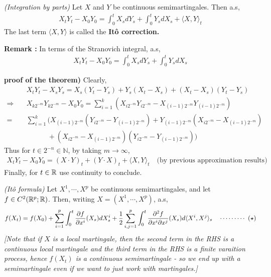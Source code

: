 \documentclass[12pt,a4paper]{article}
\newenvironment{proof}
{\begin{changemargin}{0.5cm}{0.5cm} 
	}%
	{\end{changemargin}
}
\newenvironment{p}
{\begin{proof} 
	}%
	{\end{proof}
}
\begin{document}
\thm \emph{(Integration by parts)} Let $X$ and $Y$ be continuous semimartingales. Then a.s,
\begin{align*}
X_t Y_t - X_0 Y_0 = \int_0^t X_s dY_s + \int_0^t Y_s dX_s + \langle X, Y \rangle_t
\end{align*}
The last term $\langle X, Y \rangle$ is called the \textbf{It\^o correction.}
\s

\textbf{Remark :} In terms of the Stranovich integral, a.s,
\begin{align*}
X_t Y_t - X_0 Y_0 = \int_0^t X_s dY_s + \int_0^t Y_s dX_s
\end{align*}
\begin{p}
\textbf{proof of the theorem)} Clearly,
\begin{align*}
& X_t Y_t - X_s Y_s = X_s(Y_t -Y_s) + Y_s (X_t -X_s) + (X_t -X_s)(Y_t-Y_s) \\
\Rightarrow \quad  & X_{k2^{-m}} Y_{k2^{-m}} - X_0 Y_0 = \sum_{i=1}^k ( X_{i2^{-m}} Y_{i2^{-m}} - X_{(i-1)2^{-m}} Y_{(i-1)2^{-m}}) \\
= & \sum_{i=1}^k \Big(  X_{(i-1)2^{-m}}(Y_{i2^{-m}} - Y_{(i-1)2^{-m}}) + Y_{(i-1)2^{-m}}(X_{i2^{-m}} -X_{(i-1)2^{-m}}) \\
& \quad \quad\quad + (X_{i2^{-m}} - X_{(i-1)2^{-m}})(Y_{i2^{-m}} - Y_{(i-1)2^{-m}}) \Big)
\end{align*}
Thus for $t\in 2^{-n} \in \mathbb{N}$, by taking $m\rightarrow \infty$,
\begin{align*}
X_t Y_t - X_0 Y_0 = (X\cdot Y)_t + (Y \cdot X)_t + \langle X, Y \rangle_t \quad \text{(by previous approximation results)}
\end{align*}
Finally, for $t\in \mathbb{R}$ use continuity to conclude.

\eop
\end{p}
\s

\thm \emph{(It\^o formula)} Let $X^1, \cdots, X^p$ be continuous semimartingales, and let $f \in C^2(\mathbb{R}^p ; \mathbb{R})$. Then, writing $X = (X^1, \cdots, X^p)$, a.s,
\begin{align*}
f(X_t) =  f(X_0) + \sum_{i=1}^p \int_0^t \frac{\partial f}{\partial x^i}(X_s)dX_s^i + \frac{1}{2} \sum_{i,j=1}^p \int_0^t \frac{\partial^2 f}{\partial x^i \partial x^j} (X_s) d\langle X^i, X^j \rangle_s \quad \cdots\cdots\cdots\,\,(\star)
\end{align*}
\emph{[Note that if $X$ is a local martingale, then the second term in the RHS is a continuous local martingale and the third term in the RHS is a finite varaition process, hence $f(X_t)$ is a continuous semimartingale - so we end up with a semimartingale even if we want to just work with martingales.]}
\end{document}
